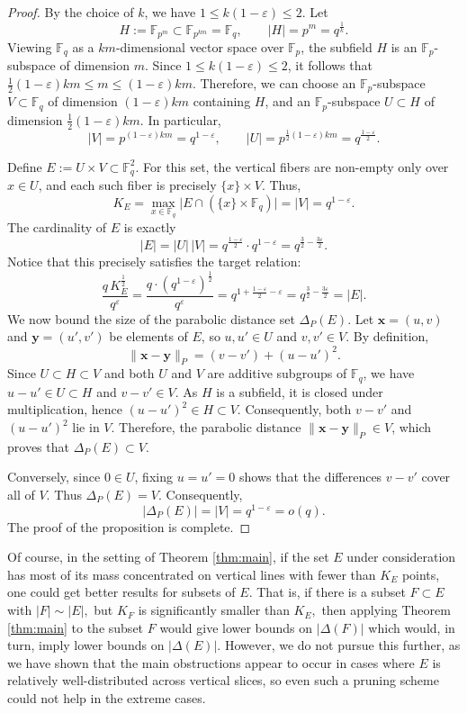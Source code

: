 \documentclass{article}
\newcommand{\F}{\mathbb{F}}
\newcommand{\1}{\mathbf{1}}
\begin{document}
\begin{proof}
By the choice of $k$, we have $1 \le k(1-\varepsilon) \le 2$. Let 
\[
H:=\F_{p^{m}}\subset \F_{p^{km}}=\F_q,
\qquad |H|=p^m=q^{\frac{1}{k}}.
\]
Viewing $\F_q$ as a $km$-dimensional vector space over $\F_p$, the subfield $H$ is an $\F_p$-subspace of dimension $m$. Since
$1 \le k(1-\varepsilon) \le 2$,
it follows that $\frac{1}{2}(1-\varepsilon)km \le m \le (1-\varepsilon)km$.
Therefore, we can choose an $\F_p$-subspace $V\subset \F_q$ of dimension $(1-\varepsilon)km$ containing $H$, and an $\F_p$-subspace $U\subset H$ of dimension $\frac{1}{2}(1-\varepsilon)km$. In particular,
\[
|V| = p^{(1-\varepsilon)km} = q^{1-\varepsilon},
\qquad
|U| = p^{\frac{1}{2}(1-\varepsilon)km} = q^{\frac{1-\varepsilon}{2}}.
\]

Define $E:=U\times V \subset \F_q^2$.
For this set, the vertical fibers are non-empty only over $x\in U$, and each such fiber is precisely $\{x\}\times V$. Thus,
\[
K_E = \max_{x\in\F_q}\bigl|E\cap (\{x\}\times \F_q)\bigr| = |V| = q^{1-\varepsilon}.
\]
The cardinality of $E$ is exactly
\[
|E| = |U| \, |V| = q^{\frac{1-\varepsilon}{2}}\cdot q^{1-\varepsilon} = q^{\frac{3}{2}-\frac{3\varepsilon}{2}}. 
\]
Notice that this precisely satisfies the target relation:
\[
\frac{q\,K_E^{\frac{1}{2}}}{q^\varepsilon} = \frac{q \cdot (q^{1-\varepsilon})^{\frac{1}{2}}}{q^\varepsilon} = q^{1 + \frac{1-\varepsilon}{2} - \varepsilon} = q^{\frac{3}{2}-\frac{3\varepsilon}{2}} = |E|.
\]
We now bound the size of the parabolic distance set $\Delta_P(E)$.
Let $\mathbf{x}=(u,v)$ and $\mathbf{y}=(u',v')$ be elements of $E$, so $u,u'\in U$ and $v,v'\in V$.
By definition, 
\[
\|\mathbf{x}-\mathbf{y}\|_P = (v-v')+(u-u')^2.
\]
Since $U\subset H\subset V$ and both $U$ and $V$ are additive subgroups of $\F_q$, we have $u-u'\in U\subset H$ and $v-v'\in V$. As $H$ is a subfield, it is closed under multiplication, hence $(u-u')^2\in H\subset V$. Consequently, both $v-v'$ and $(u-u')^2$ lie in $V$.
Therefore, the parabolic distance $\|\mathbf{x}-\mathbf{y}\|_P \in V$, which proves that $\Delta_P(E)\subset V$.

Conversely, since $0 \in U$, fixing $u=u'=0$ shows that the differences $v-v'$ cover all of $V$. Thus $\Delta_P(E) = V$.
Consequently,
\[
|\Delta_P(E)| = |V| = q^{1-\varepsilon} = o(q).
\]
The proof of the proposition is complete.
\end{proof}

Of course, in the setting of Theorem \ref{thm:main}, if the set $E$ under consideration has most of its mass concentrated on vertical lines with fewer than $K_E$ points, one could get better results for subsets of $E.$ That is, if there is a subset $F\subset E$ with $|F|\sim|E|,$ but $K_F$ is significantly smaller than $K_E,$ then applying Theorem \ref{thm:main} to the subset $F$ would give lower bounds on $|\Delta(F)|$ which would, in turn, imply lower bounds on $|\Delta(E)|.$ However, we do not pursue this further, as we have shown that the main obstructions appear to occur in cases where $E$ is relatively well-distributed across vertical slices, so even such a pruning scheme could not help in the extreme cases.
\end{document}
